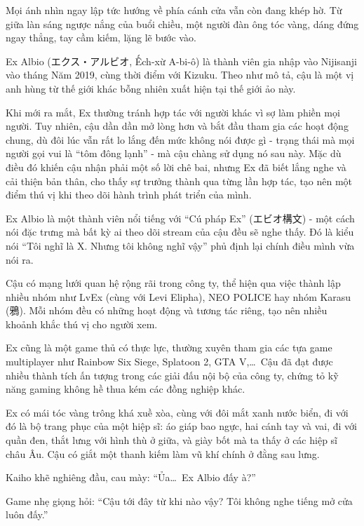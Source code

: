 \documentclass[../main.tex]{subfiles}
\begin{document}
Mọi ánh nhìn ngay lập tức hướng về phía cánh cửa vẫn còn đang khép hờ. Từ giữa làn sáng ngược nắng của buổi chiều, một người đàn ông tóc vàng, dáng đứng ngay thẳng, tay cầm kiếm, lặng lẽ bước vào.

\chrint


Ex Albio (エクス・アルビオ, Ếch-xừ A-bi-ô) là thành viên gia nhập vào Nijisanji vào tháng Năm 2019, cùng thời điểm với Kizuku. Theo như mô tả, cậu là một vị anh hùng từ thế giới khác bỗng nhiên xuất hiện tại thế giới ảo này.

Khi mới ra mắt, Ex thường tránh hợp tác với người khác vì sợ làm phiền mọi người. Tuy nhiên, cậu dần dần mở lòng hơn và bắt đầu tham gia các hoạt động chung, dù đôi lúc vẫn rất lo lắng đến mức không nói được gì - trạng thái mà mọi người gọi vui là ``tôm đông lạnh'' - mà cậu chàng sử dụng nó sau này. Mặc dù điều đó khiến cậu nhận phải một số lời chê bai, nhưng Ex đã biết lắng nghe và cải thiện bản thân, cho thấy sự trưởng thành qua từng lần hợp tác, tạo nên một điểm thú vị khi theo dõi hành trình phát triển của mình.

Ex Albio là một thành viên nổi tiếng với ``Cú pháp Ex'' (エビオ構文) - một cách nói đặc trưng mà bất kỳ ai theo dõi stream của cậu đều sẽ nghe thấy. Đó là kiểu nói ``Tôi nghĩ là X. Nhưng tôi không nghĩ vậy'' phủ định lại chính điều mình vừa nói ra.

Cậu có mạng lưới quan hệ rộng rãi trong công ty, thể hiện qua việc thành lập nhiều nhóm như LvEx (cùng với Levi Elipha), NEO POLICE hay nhóm Karasu (鴉). Mỗi nhóm đều có những hoạt động và tương tác riêng, tạo nên nhiều khoảnh khắc thú vị cho người xem.

Ex cũng là một game thủ có thực lực, thường xuyên tham gia các tựa game multiplayer như Rainbow Six Siege, Splatoon 2, GTA V,\dots\ Cậu đã đạt được nhiều thành tích ấn tượng trong các giải đấu nội bộ của công ty, chứng tỏ kỹ năng gaming không hề thua kém các đồng nghiệp khác.

Ex có mái tóc vàng trông khá xuề xòa, cùng với đôi mắt xanh nước biển, đi với đó là bộ trang phục của một hiệp sĩ: áo giáp bao ngực, hai cánh tay và vai, đi với quần đen, thắt lưng với hình thù ở giữa, và giày bốt mà ta thấy ở các hiệp sĩ châu Âu. Cậu có giắt một thanh kiếm làm vũ khí chính ở đằng sau lưng.

\chrint

Kaiho khẽ nghiêng đầu, cau mày: ``Ủa\dots\ Ex Albio đấy à?''

Game nhẹ giọng hỏi: ``Cậu tới đây từ khi nào vậy? Tôi không nghe tiếng mở cửa luôn đấy.''
\end{document}
